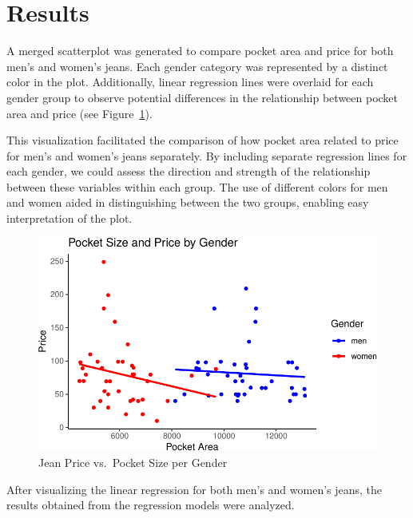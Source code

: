 \documentclass[
  letterpaper,
  DIV=11,
  numbers=noendperiod]{scrartcl}
\begin{document}
\hypertarget{results}{%
\section{Results}\label{results}}

A merged scatterplot was generated to compare pocket area and price for
both men's and women's jeans. Each gender category was represented by a
distinct color in the plot. Additionally, linear regression lines were
overlaid for each gender group to observe potential differences in the
relationship between pocket area and price (see
Figure~\ref{fig-price_per_pocket_gender}).

This visualization facilitated the comparison of how pocket area related
to price for men's and women's jeans separately. By including separate
regression lines for each gender, we could assess the direction and
strength of the relationship between these variables within each group.
The use of different colors for men and women aided in distinguishing
between the two groups, enabling easy interpretation of the plot.

\begin{figure}

{\centering \includegraphics{paper_files/figure-pdf/fig-price_per_pocket_gender-1.pdf}

}

\caption{\label{fig-price_per_pocket_gender}Jean Price vs.~Pocket Size
per Gender}

\end{figure}

After visualizing the linear regression for both men's and women's
jeans, the results obtained from the regression models were analyzed.
\end{document}
